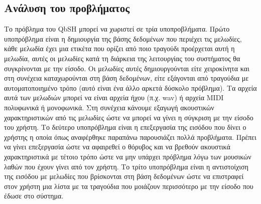 \subsection{Ανάλυση του προβλήματος}
Το πρόβλημα του QbSH μπορεί να χωριστεί σε τρία υποπροβλήματα. Πρώτο
υποπρόβλημα είναι η δημιουργία της βάσης δεδομένων που περιέχει τις μελωδίες,
κάθε μελωδία έχει μια ετικέτα που ορίζει από ποιο τραγούδι προέρχεται αυτή η
μελωδία, αυτές οι μελωδίες κατά τη διάρκεια της λειτουργίας του συστήματος θα
συγκρίνονται με την είσοδο. Οι μελωδίες αυτές δημιουργούνται είτε χειροκίνητα
και στη συνέχεια καταχωρούνται στη βάση δεδομένων, είτε εξάγονται από τραγούδια
με αυτοματοποιημένο τρόπο (αυτό είναι ένα άλλο αρκετά δύσκολο πρόβλημα).
Τα αρχεία αυτά των μελωδιών μπορεί να είναι αρχεία ήχου (π.χ. wav) ή αρχεία
MIDI πολυφωνικά ή μονοφωνικά. Στη συνέχεια κάνουμε εξαγωγή ακουστικών
χαρακτηριστικών από τις μελωδίες ώστε να μπορεί να γίνει η σύγκριση με την
είσοδο του χρήστη.
\newline
Το δεύτερο υποπρόβλημα είναι η επεξεργασία της εισόδου που δίνει ο χρήστης η
οποία όπως αναφέρθηκε παραπάνω παρουσιάζει πολλά προβλήματα. Πρέπει να γίνει
επεξεργασία ώστε να αφαιρεθεί ο θόρυβος και να βρεθούν ακουστικά χαρακτηριστικά
με τέτοιο τρόπο ώστε να μην υπάρχει πρόβλημα λόγω των μουσικών λαθών που έχουν
γίνει από τον χρήστη.
\newline
Το τρίτο υποπρόβλημα είναι η αντιστοίχιση της εισόδου με μελωδίες που βρίσκονται
στη βάση δεδομένων ώστε να επιστραφεί στον χρήστη μια λίστα με τα τραγούδια που
μοιάζουν περισσότερο με την είσοδο που έδωσε στο σύστημα.

